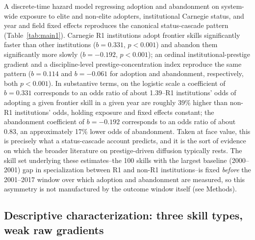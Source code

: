 \documentclass[11pt, letterpaper]{article}
\begin{document}
A discrete-time hazard model regressing adoption and abandonment on system-wide exposure to elite and non-elite adopters, institutional Carnegie status, and year and field fixed effects reproduces the canonical status-cascade pattern (Table~\ref{tab:main1}). Carnegie R1 institutions adopt frontier skills significantly faster than other institutions ($b=0.331$, $p<0.001$) and abandon them significantly more slowly ($b=-0.192$, $p<0.001$); an ordinal institutional-prestige gradient and a discipline-level prestige-concentration index reproduce the same pattern ($b=0.114$ and $b=-0.061$ for adoption and abandonment, respectively, both $p<0.001$). In substantive terms, on the logistic scale a coefficient of $b=0.331$ corresponds to an odds ratio of about 1.39--R1 institutions' odds of adopting a given frontier skill in a given year are roughly 39\% higher than non-R1 institutions' odds, holding exposure and fixed effects constant; the abandonment coefficient of $b=-0.192$ corresponds to an odds ratio of about 0.83, an approximately 17\% lower odds of abandonment. Taken at face value, this is precisely what a status-cascade account predicts, and it is the sort of evidence on which the broader literature on prestige-driven diffusion typically rests. The skill set underlying these estimates--the 100 skills with the largest baseline (2000--2001) gap in specialization between R1 and non-R1 institutions--is fixed \emph{before} the 2001--2017 window over which adoption and abandonment are measured, so this asymmetry is not manufactured by the outcome window itself (see Methods).

\subsection*{Descriptive characterization: three skill types, weak raw gradients}
\end{document}
